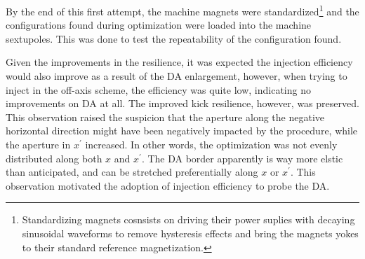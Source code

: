 By the end of this first attempt, the machine magnets were standardized\footnote{Standardizing magnets cosnsists on driving their power suplies with decaying sinusoidal waveforms to remove hysteresis effects and bring the magnets yokes to their standard reference magnetization.} and the configurations found during optimization were loaded into the machine sextupoles. This was done to test the repeatability of the configuration found.

Given the improvements in the resilience, it was expected the injection efficiency would also improve as a result of the DA enlargement, however, when trying to inject in the off-axis scheme, the efficiency was quite low, indicating no improvements on DA at all. The improved kick resilience, however, was preserved. This observation raised the suspicion that the aperture along the negative horizontal direction might have been negatively impacted by the procedure, while the aperture in $x^\prime$ increased. In other words, the optimization was not evenly distributed along both $x$ and $x^\prime$. The DA border apparently is way more elstic than anticipated, and can be stretched preferentially along $x$ or $x^\prime$. This observation motivated the adoption of injection efficiency to probe the DA.
